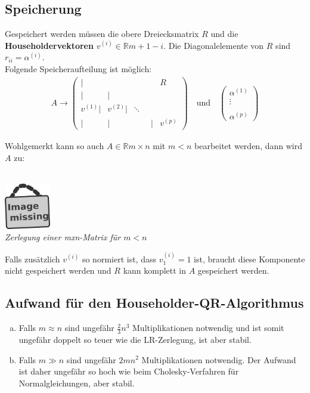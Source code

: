 \documentclass[ngerman,fontsize=11pt, paper=a4, parskip=half, titlepage=true, toc=bib]{scrbook}
\newcommand{\R}{\mathds{R}}
\newcommand{\imagemissing}[1]{
	\begin{center}~\\
		\centering 
		\includegraphics[width=2cm]{images/image_missing.jpg}\\
		\textit{#1} \\
	\end{center}
}
\begin{document}
	\subsection{Speicherung}
	Gespeichert werden müssen die obere Dreiecksmatrix $R$ und die 
	\textbf{Householdervektoren} 
	$v^{(i)}\in \R{m+1-i}$.
	Die Diagonalelemente von $R$ sind $r_{ii} = \alpha^{(i)}$. \\
	Folgende Speicheraufteilung ist möglich:
	\begin{gather*}
		A \longrightarrow \left(
		\begin{array}{rrrrr}
			|&&& R \\
			|&| \\
			v^{(1)}| & v^{(2)}|&\ddots ~~\\
			| &|&\phantom{v^{(i)}}|& v^{(p)}			
		\end{array}
		\right)
		\quad \text{und} \quad 
		\begin{pmatrix}
			\alpha^{(1)} \\ \vdots \\ \\ \alpha^{(p)}
		\end{pmatrix}
	\end{gather*}
	  
	  Wohlgemerkt kann so auch $A\in \R{m\times n}$ mit $m<n$ bearbeitet werden,
	  dann wird $A$ zu:
	  
	  \imagemissing{Zerlegung einer mxn-Matrix für $m<n$}
	  
	  Falls zusätzlich $v^{(i)}$ so normiert ist,
	  dass $v_1^{(i)} = 1$ ist, braucht diese Komponente nicht gespeichert werden 
	  und $R$ kann komplett in $A$ gespeichert werden.
	  
	  \subsection{Aufwand für den Householder-QR-Algorithmus}
	  \begin{enumerate}[a)]
	  	\item Falls $m\approx n$ sind ungefähr $\frac{2}{3}n^3$ Multiplikationen notwendig
	  	und ist somit ungefähr doppelt so teuer wie die LR-Zerlegung, ist aber stabil.
	  	\item Falls $m\gg n$ sind ungefähr $2mn^2$ Multiplikationen notwendig.
	  	Der Aufwand ist daher ungefähr so hoch wie beim Cholesky-Verfahren für Normalgleichungen,
	  	aber stabil.
	  \end{enumerate}
	  
	  
\end{document}
